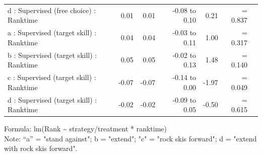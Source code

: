 \documentclass{article}
\begin{document}
\begin{longtable}{lrrrrrl}
d : Supervised (free choice) : Ranktime & 0.01 & 0.01 & -0.08 to 0.10 & 0.21 &  =  0.837 \\ 
a : Supervised (target skill) : Ranktime & 0.04 & 0.04 & -0.03 to 0.11 & 1.00 &  =  0.317 \\ 
b : Supervised (target skill) : Ranktime & 0.05 & 0.05 & -0.02 to 0.13 & 1.48 &  =  0.140 \\ 
c : Supervised (target skill) : Ranktime & -0.07 & -0.07 & -0.14 to 0.00 & -1.97 &  =  0.049 \\ 
d : Supervised (target skill) : Ranktime & -0.02 & -0.02 & -0.09 to 0.05 & -0.50 &  =  0.615 \\ 
\bottomrule
\end{longtable}
\begin{minipage}{\linewidth}
Formula: lm(Rank \textasciitilde{} strategy/treatment * ranktime)\\
Note: “a” = "stand against"; b = "extend"; "c" = "rock skis forward"; d = "extend with rock skis forward". 
\end{minipage}
\end{document}
